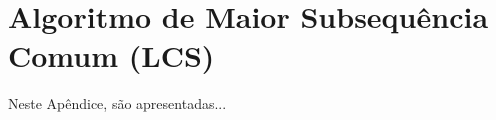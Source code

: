 
\chapter{Algoritmo de Maior Subsequência Comum (LCS)}
\label{apd:4:complementacao}

Neste Apêndice, são apresentadas...


